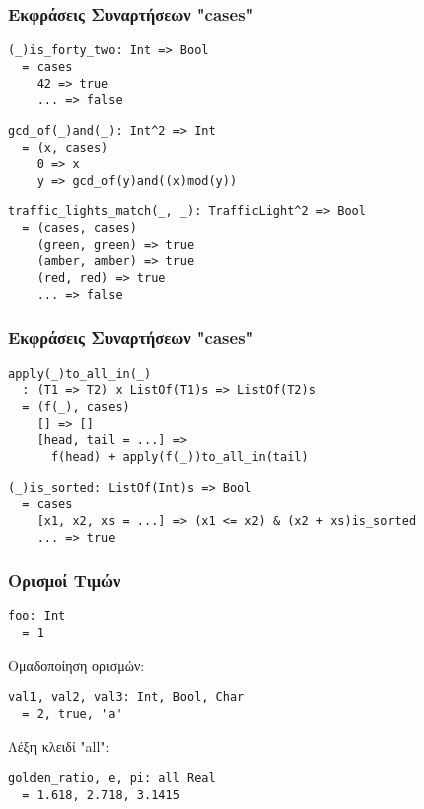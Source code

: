 \documentclass{beamer}
\def\e{\foreignlanguage{english}}
\begin{document}
\begin{frame}[fragile]

\frametitle{Εκφράσεις Συναρτήσεων \e{"cases"}}

\begin{otherlanguage}{english}
\begin{verbatim}
(_)is_forty_two: Int => Bool
  = cases
    42 => true
    ... => false
\end{verbatim}
\pause
\begin{verbatim}
gcd_of(_)and(_): Int^2 => Int
  = (x, cases)
    0 => x
    y => gcd_of(y)and((x)mod(y))
\end{verbatim}
\pause
\begin{verbatim}
traffic_lights_match(_, _): TrafficLight^2 => Bool
  = (cases, cases)
    (green, green) => true
    (amber, amber) => true
    (red, red) => true
    ... => false
\end{verbatim}
\end{otherlanguage}

\end{frame}

\begin{frame}[fragile]

\frametitle{Εκφράσεις Συναρτήσεων \e{"cases"}}

\begin{otherlanguage}{english}
\begin{verbatim}
apply(_)to_all_in(_)
  : (T1 => T2) x ListOf(T1)s => ListOf(T2)s
  = (f(_), cases)
    [] => []
    [head, tail = ...] =>
      f(head) + apply(f(_))to_all_in(tail)
\end{verbatim}
\pause
\begin{verbatim}
(_)is_sorted: ListOf(Int)s => Bool
  = cases
    [x1, x2, xs = ...] => (x1 <= x2) & (x2 + xs)is_sorted
    ... => true
\end{verbatim}
\end{otherlanguage}

\end{frame}

\begin{frame}[fragile]

\frametitle{Ορισμοί Τιμών}

\begin{otherlanguage}{english}
\begin{verbatim}
foo: Int
  = 1
\end{verbatim}
\end{otherlanguage}

\pause
Ομαδοποίηση ορισμών:
\begin{otherlanguage}{english}
\begin{verbatim}
val1, val2, val3: Int, Bool, Char
  = 2, true, 'a'
\end{verbatim}
\end{otherlanguage}

\pause
Λέξη κλειδί \e{"all"}:
\begin{otherlanguage}{english}
\begin{verbatim}
golden_ratio, e, pi: all Real
  = 1.618, 2.718, 3.1415
\end{verbatim}
\end{otherlanguage}

\end{frame}
\end{document}
